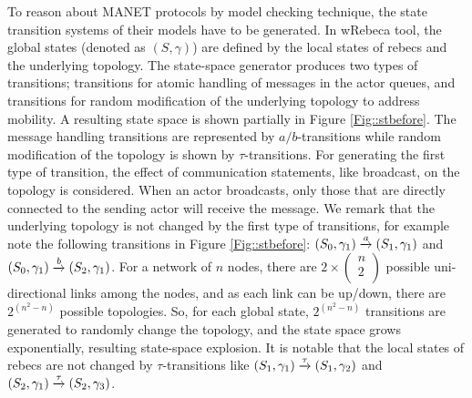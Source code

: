 To reason about MANET protocols by  model checking technique, the state transition systems of their models have to be generated. In wRebeca tool, the global states (denoted as $(S,\gamma)$) are defined by the local states of rebecs and the underlying topology.
%
The state-space generator produces two types of transitions; transitions for atomic handling of messages in the actor queues, and transitions for random modification of the underlying topology to address mobility. A resulting state space %
is shown partially in Figure \ref{Fig::stbefore}. The message handling transitions are represented by $a/b$-transitions while random modification of the topology is shown by $\tau$-transitions. %
For generating the first type of transition, the effect of communication statements, like broadcast, on the topology is considered.
When an actor broadcasts, only those that are directly connected to the sending actor will receive the message. We remark that the underlying topology is not changed by the first type of transitions, for example note the following transitions in Figure \ref{Fig::stbefore}:  $(S_0,\gamma_1)\overto{a}(S_1,\gamma_1)$  and $(S_0,\gamma_1)\overto{b}(S_2,\gamma_1)$. For a network of $n$ nodes, there are $2\times \begin{pmatrix}
n \\
2 \\
\end{pmatrix}$ possible uni-directional links among the nodes, and as each link can be up/down, there are $2^{(n^2-n)}$ possible topologies. So, for each global state, $2^{(n^2-n)}$ transitions are generated to randomly change the topology, and the state space grows exponentially, resulting state-space explosion. It is notable that the local states of rebecs are not changed by $\tau$-transitions like $(S_1,\gamma_1)\overto{\tau}(S_1,\gamma_2)$ and $(S_2,\gamma_1)\overto{\tau}(S_2,\gamma_3)$.

